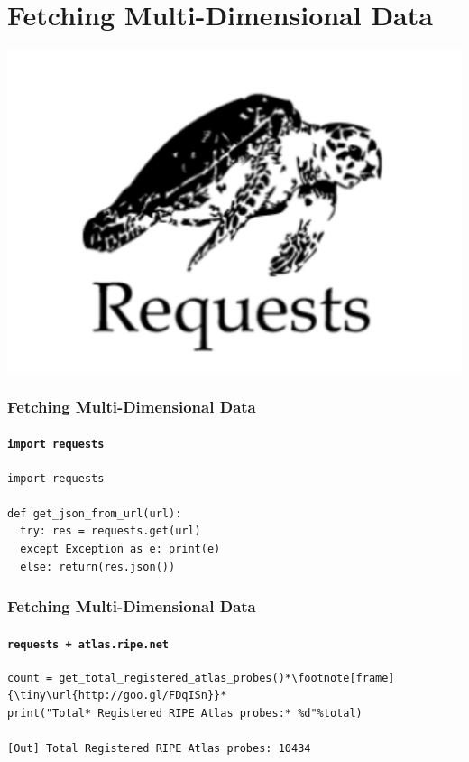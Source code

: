 
\section{Fetching Multi-Dimensional Data}

\begin{frame}[fragile]

  \includegraphics[width=0.17\linewidth]{figures/requests} \\

  \frametitle{Fetching Multi-Dimensional Data}
  \framesubtitle{\texttt{import requests}}
    \begin{lstlisting}
import requests

def get_json_from_url(url):
  try: res = requests.get(url)
  except Exception as e: print(e)
  else: return(res.json())
    \end{lstlisting}

\end{frame}

\begin{frame}[fragile]
  \frametitle{Fetching Multi-Dimensional Data}
  \framesubtitle{\texttt{requests + atlas.ripe.net}}

    \begin{lstlisting}
count = get_total_registered_atlas_probes()*\footnote[frame]{\tiny\url{http://goo.gl/FDqISn}}*
print("Total* Registered RIPE Atlas probes:* %d"%total)

[Out] Total Registered RIPE Atlas probes: 10434
    \end{lstlisting}
\end{frame}


